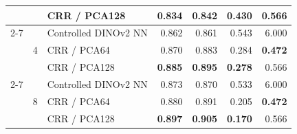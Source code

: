 \begin{table}[t]
{\begin{tabular}{ll lrrrr}
& & CRR / PCA128 & \textbf{0.834} & \textbf{0.842} & 0.430 & 0.566 \\
\cmidrule(lr){2-7}
& \multirow{3}{*}{4} & Controlled DINOv2 NN & 0.862 & 0.861 & 0.543 & 6.000 \\
& & CRR / PCA64 & 0.870 & 0.883 & 0.284 & \textbf{0.472} \\
& & CRR / PCA128 & \textbf{0.885} & \textbf{0.895} & \textbf{0.278} & 0.566 \\
\cmidrule(lr){2-7}
& \multirow{3}{*}{8} & Controlled DINOv2 NN & 0.873 & 0.870 & 0.533 & 6.000 \\
& & CRR / PCA64 & 0.880 & 0.891 & 0.205 & \textbf{0.472} \\
& & CRR / PCA128 & \textbf{0.897} & \textbf{0.905} & \textbf{0.170} & 0.566 \\
\bottomrule
\end{tabular}%
}
\end{table}
